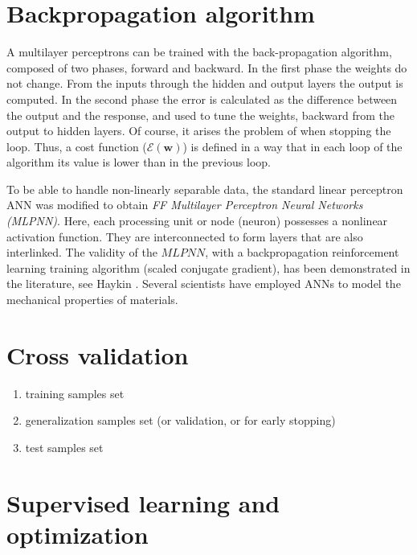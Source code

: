 
\section{Backpropagation algorithm}
\label{sec:backpropagationalgorithm}

A multilayer perceptrons can be trained with the back-propagation algorithm,
composed of two phases, forward and backward.
In the first phase the weights do not change. 
From the inputs through the hidden
and output layers the output is computed. 
In the second phase the error is calculated as the difference between the output
and the response, and used to tune the weights, backward from the output to
hidden layers.
Of course, it arises the problem of when stopping the loop. Thus, a cost
function ($\mathscr{E}(\mathbf{w})$) is defined in a way that in each loop of
the algorithm its value is lower than in the previous loop.


To be able to handle non-linearly separable data, the standard linear perceptron
\acs{ANN} was modified to obtain \textit{FF Multilayer Perceptron Neural Networks
(MLPNN)}.
Here, each processing unit or node (neuron) possesses a nonlinear activation function. 
They are interconnected to form layers that are also interlinked. 
The validity of the $MLPNN$, with a backpropagation reinforcement learning 
training algorithm (scaled conjugate gradient), has been demonstrated in the 
literature, see Haykin \cite{RefWorks:158}. Several scientists 
\cite{RefWorks:161, RefWorks:166, RefWorks:167, RefWorks:168, RefWorks:169,
RefWorks:170, RefWorks:178, RefWorks:179} have employed \acs{ANNs} to model
the mechanical properties of materials.

\section{Cross validation}
\label{sec:crossvalidation}

\begin{enumerate}
  \item{training samples set}
  \item{generalization samples set (or validation, or for early stopping)}
  \item{test samples set}
\end{enumerate}

\section{Supervised learning and optimization}
\label{sec:supervisedlearningandoptimization}

